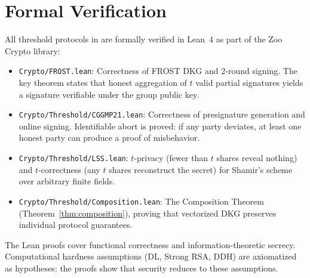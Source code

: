 \section{Formal Verification}

\label{sec:formal}

All threshold protocols in \TChain{} are formally verified in Lean~4 as part of the Zoo Crypto library:

\begin{itemize}
\item \texttt{Crypto/FROST.lean}: Correctness of FROST DKG and 2-round signing. The key theorem states that honest aggregation of $t$ valid partial signatures yields a signature verifiable under the group public key.
\item \texttt{Crypto/Threshold/CGGMP21.lean}: Correctness of presignature generation and online signing. Identifiable abort is proved: if any party deviates, at least one honest party can produce a proof of misbehavior.
\item \texttt{Crypto/Threshold/LSS.lean}: $t$-privacy (fewer than $t$ shares reveal nothing) and $t$-correctness (any $t$ shares reconstruct the secret) for Shamir's scheme over arbitrary finite fields.
\item \texttt{Crypto/Threshold/Composition.lean}: The Composition Theorem (Theorem~\ref{thm:composition}), proving that vectorized DKG preserves individual protocol guarantees.
\end{itemize}

\begin{remark}
The Lean proofs cover functional correctness and information-theoretic secrecy. Computational hardness assumptions (DL, Strong RSA, DDH) are axiomatized as hypotheses; the proofs show that security reduces to these assumptions.
\end{remark}

